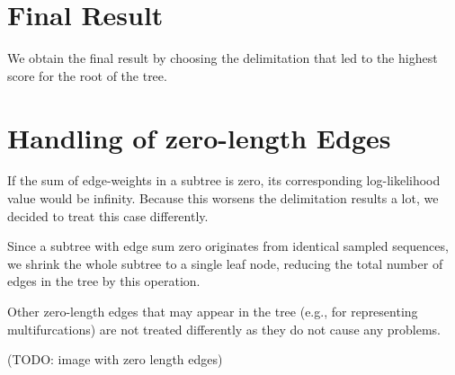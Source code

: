 \documentclass{llncs}
\begin{document}
\section{Final Result}
We obtain the final result by choosing the delimitation that led to the highest score for the root of the tree.

\section{Handling of zero-length Edges}

If the sum of edge-weights in a subtree is zero, its corresponding log-likelihood value would be infinity. Because this worsens the delimitation results a lot, we decided to treat this case differently.

Since a subtree with edge sum zero originates from identical sampled sequences, we shrink the whole subtree to a single leaf node, reducing the total number of edges in the tree by this operation.

Other zero-length edges that may appear in the tree (e.g., for representing multifurcations) are not treated differently as they do not cause any problems.

(TODO: image with zero length edges)



\end{document}

